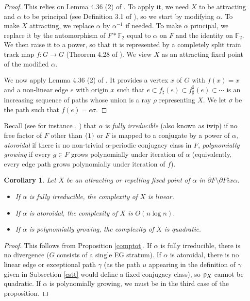 \documentclass[11pt]{amsart}
\newtheorem{cor}[thm]{Corollary}
\theoremstyle{remark}
\newcommand{\m} {^{-1}}
\newcommand{\cp}{{\sf  p}}
\newcommand{\inc}{\subset}
\newcommand {\F} {{\mathbb {F}}}
\newcommand{\bo}{\partial}
\begin{document}
 \begin{proof}
 This relies on Lemma 4.36 (2) of \cite{recogn}. To apply it, we need $X$ to be attracting and $\alpha$ to be principal (see Definition 3.1 of \cite{recogn}), so we   start by modifying $\alpha$. To make $X$ attracting,  we   replace $\alpha$   by $\alpha{\m}$ if needed. To make $\alpha$ principal, we replace it by the automorphism of $F*\F_2$ equal to $\alpha$ on $F$ and the identity on $\F_2$. We then   raise it to a power, so that it is represented by a   completely split train track map $f:G\to G$ (Theorem 4.28 of \cite{recogn}). We view $X$ as an attracting fixed point of the modified $\alpha$.
 
 
 We now apply Lemma 4.36 (2) of \cite{recogn}. It provides a vertex $x$ of $G$ with $f(x)=x$ and a non-linear edge $e$ with origin $x$ such that $e\inc f_\sharp(e)\inc f^2_\sharp(e)\inc\cdots$ is an increasing sequence of paths whose union is a ray $\rho$ representing $X$. We   let $\sigma$ be  the path such that   $f(e)=e\sigma$.
 \end{proof}
 
Recall    (see for instance \cite{Kapo}, \cite{counting}) that $\alpha$ is 
\emph{fully irreducible} (also known as iwip) if  no free factor of $F$ other than $\{1\}$ or $ F$ is mapped to a conjugate by a power of $\alpha$, \emph{atoroidal} if there is no non-trivial $\alpha$-periodic conjugacy class in $F$, \emph{polynomially growing} if    every $g\in F$ grows polynomially under iteration of $\alpha$ (equivalently, 
every edge path grows polynomially under iteration of $f$). 


\begin{cor}\label{cassimples}  Let  $X$ be an attracting or repelling  fixed point  of $\alpha$  in $\bo F\setminus\bo Fix \alpha$.
\begin{itemize}
 
\item
If $\alpha$ is fully irreducible, the complexity of $X$  is linear.
\item
If $\alpha$ is atoroidal, the complexity of $X$  is $O(n\log n)$.

\item
 If $\alpha$ is polynomially growing, the complexity of $X$ is quadratic. 
 \end{itemize}
\end{cor}

\begin{proof}
This follows from   
Proposition \ref{comptot}. If $\alpha$ is fully irreducible, there is no divergence   ($G$ consists of a single EG stratum). If $\alpha$ is atoroidal, there is no linear edge or exceptional path    $\gamma$ (as the path $u$ appearing in the definition of $\gamma$ given in Subsection \ref{cstt} would define a fixed conjugacy class), so $\cp_X$ cannot be quadratic. If $\alpha$ is polynomially growing, we must be in the third case of the proposition.
\end{proof}
\end{document}

